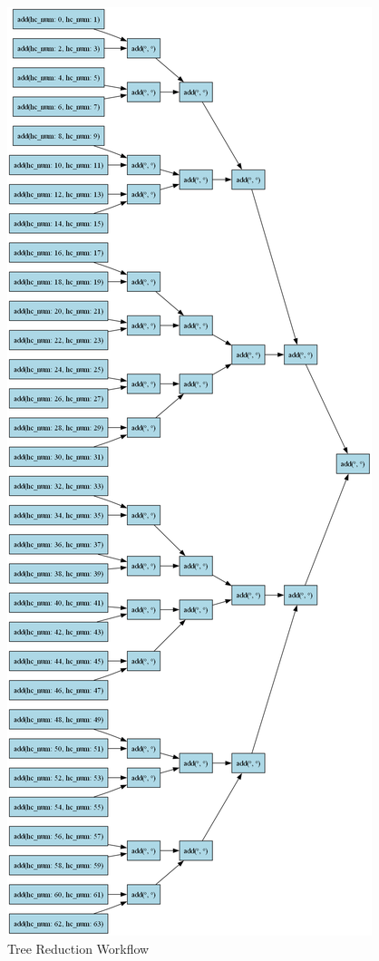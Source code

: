 \documentclass[conference]{IEEEtran}
\begin{document}
\begin{figure}[h]
    \centering
    \includegraphics[width=\linewidth, height=0.85\textheight]{figures/dag_image_tree_reduction.png}
    \caption{Tree Reduction Workflow}
    \label{fig:tree_reduction}
\end{figure}
\end{document}
